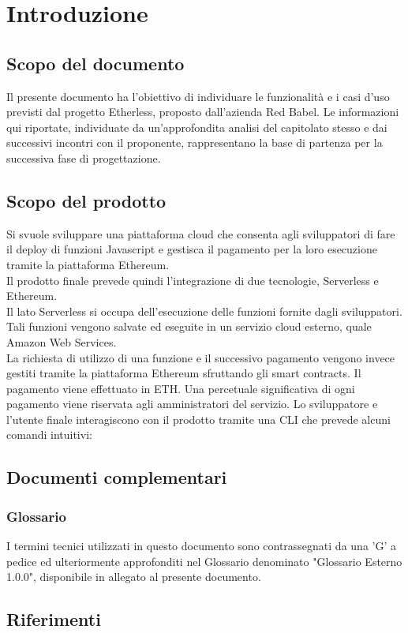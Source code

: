 \section{Introduzione}
\subsection{Scopo del documento}
Il presente documento ha l'obiettivo di individuare le funzionalità e i casi d'uso previsti dal progetto Etherless, proposto dall'azienda Red Babel. Le informazioni qui riportate, individuate da un'approfondita analisi del capitolato stesso e dai successivi incontri con il proponente, rappresentano la base di partenza per la successiva fase di progettazione.
\subsection{Scopo del prodotto}
Si svuole sviluppare una piattaforma cloud che consenta agli sviluppatori di fare il deploy di funzioni Javascript e gestisca il pagamento per la loro esecuzione tramite la piattaforma Ethereum.\\
Il prodotto finale prevede quindi l'integrazione di due tecnologie, Serverless e Ethereum.\\
Il lato Serverless si occupa dell'esecuzione delle funzioni fornite dagli sviluppatori. Tali funzioni vengono salvate ed eseguite in un servizio cloud esterno, quale Amazon Web Services.  \\La richiesta di utilizzo di una funzione e il successivo pagamento vengono invece gestiti tramite la piattaforma Ethereum sfruttando gli smart contracts. Il pagamento viene effettuato in ETH. Una percetuale significativa di ogni pagamento viene riservata agli amministratori del servizio. 
Lo sviluppatore e l'utente finale interagiscono con il prodotto tramite una CLI che prevede alcuni comandi intuitivi:
\subsection{Documenti complementari}
\subsubsection{Glossario}
	I termini tecnici utilizzati in questo documento sono contrassegnati da una ’G’ a pedice ed ulteriormente approfonditi nel Glossario denominato "Glossario Esterno 1.0.0", disponibile in allegato al presente documento.
\subsection{Riferimenti}
